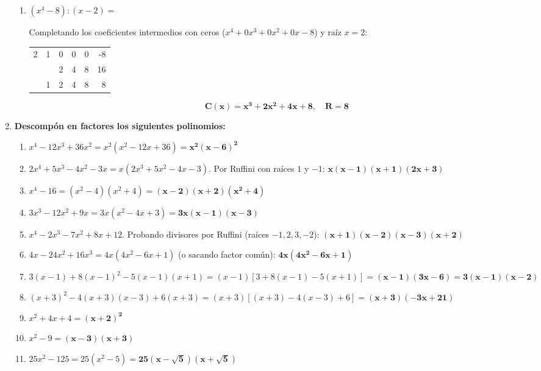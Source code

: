 \documentclass[11pt,a4paper]{article}
\begin{document}
\begin{enumerate}[label=\textbf{\arabic*.}, leftmargin=*]
\begin{enumerate}[label=\textit{\alph*})]
            \item $(x^4 - 8) : (x - 2) =$
            
             Completando los coeficientes intermedios con ceros ($x^4 + 0x^3 + 0x^2 + 0x - 8$) y raíz $x = 2$:
            \begin{center}
            \begin{tabular}{r|rrrrr}
              2 & 1 & 0 & 0 & 0 & -8 \\
              & & 2 & 4 & 8 & 16 \\
              \hline
              & 1 & 2 & 4 & 8 & \multicolumn{1}{|r}{8}
            \end{tabular}
            \end{center}
            $$\mathbf{C(x) = x^3 + 2x^2 + 4x + 8}, \quad \mathbf{R = 8}$$
        \end{enumerate}

    \item \textbf{Descompón en factores los siguientes polinomios:}
        \begin{enumerate}[label=\alph*), itemsep=0.8em]
            \item $x^4 - 12x^3 + 36x^2 = x^2(x^2 - 12x + 36) = \mathbf{x^2(x - 6)^2}$
            \item $2x^4 + 5x^3 - 4x^2 - 3x = x(2x^3 + 5x^2 - 4x - 3)$. Por Ruffini con raíces $1$ y $-1$:
            $\mathbf{x(x - 1)(x + 1)(2x + 3)}$
            \item $x^4 - 16 = (x^2 - 4)(x^2 + 4) = \mathbf{(x - 2)(x + 2)(x^2 + 4)}$
            \item $3x^3 - 12x^2 + 9x = 3x(x^2 - 4x + 3) = \mathbf{3x(x - 1)(x - 3)}$
            \item $x^4 - 2x^3 - 7x^2 + 8x + 12$. Probando divisores por Ruffini (raíces $-1, 2, 3, -2$):
            $\mathbf{(x + 1)(x - 2)(x - 3)(x + 2)}$
            \item $4x - 24x^2 + 16x^3 = 4x(4x^2 - 6x + 1)$ (o sacando factor común): $\mathbf{4x(4x^2 - 6x + 1)}$
            \item $3(x - 1) + 8(x - 1)^2 - 5(x - 1)(x + 1) = (x - 1)[3 + 8(x - 1) - 5(x + 1)] = \mathbf{(x - 1)(3x - 6)} = \mathbf{3(x - 1)(x - 2)}$
            \item $(x + 3)^2 - 4(x + 3)(x - 3) + 6(x + 3) = (x + 3)[(x + 3) - 4(x - 3) + 6] = \mathbf{(x + 3)(-3x + 21)}$
            \item $x^2 + 4x + 4 = \mathbf{(x + 2)^2}$
            \item $x^2 - 9 = \mathbf{(x - 3)(x + 3)}$
            \item $25x^2 - 125 = 25(x^2 - 5) = \mathbf{25(x - \sqrt{5})(x + \sqrt{5})}$
        \end{enumerate}


\end{enumerate}
\end{document}
